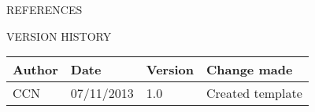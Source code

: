 \documentclass{article}
\begin{document}
	\nocite{LaTeXTemplate}

	\newpage
	\begin{section}{REFERENCES}
		
		
	\end{section}
	
	\vspace{1cm}
	\begin{section}{VERSION HISTORY}
		\begin{tabularx}{\linewidth}{| p{2cm} | p{2cm} | p{2cm} | X | }
			\hline
			\bf{Author} & \bf{Date} & \bf{Version} & \bf{Change made} \\
			\hline
			CCN & 07/11/2013 & 1.0 & Created template \\
			\hline
		\end{tabularx}
	\end{section}
\end{document}
